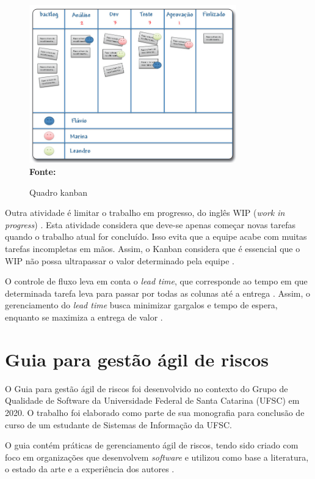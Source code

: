 \documentclass[
    12pt,       %
    openright,      %
    twoside,      %
    a4paper,      %
    english,      %
    french,       %
    spanish,      %
    brazil,       %
    ]{abntex2}
\begin{document}
\begin{figure}[h!]
    \centering
    \caption{Quadro kanban}
    \includegraphics[width=0.8\textwidth]{src/tex/img/quadroKanban.png}\\
    \textbf{Fonte:} 
    \label{fig:kanban}
\end{figure}

Outra atividade é limitar o trabalho em progresso, do inglês WIP (\textit{work in progress}) \cite{Mariotti:2012}. Esta atividade considera que deve-se apenas começar novas tarefas quando o trabalho atual for concluído. Isso evita que a equipe acabe com muitas tarefas incompletas em mãos. Assim, o Kanban considera que é essencial que o WIP não possa ultrapassar o valor determinado pela equipe \cite{ANDERSON:2016}.

O controle de fluxo leva em conta o \textit{lead time}, que corresponde ao tempo em que determinada tarefa leva para passar por todas as colunas até a entrega \cite{Mariotti:2012}. Assim, o gerenciamento do \textit{lead time} busca minimizar gargalos e tempo de espera, enquanto se maximiza a entrega de valor \cite{ANDERSON:2016}. 

\section{Guia para gestão ágil de riscos}

O Guia para gestão ágil de riscos foi desenvolvido no contexto do Grupo de Qualidade de Software da Universidade Federal de Santa Catarina (UFSC) em 2020. O trabalho foi elaborado como parte de sua monografia para conclusão de curso de um estudante de Sistemas de Informação da UFSC.

O guia contém práticas de gerenciamento ágil de riscos, tendo sido criado com foco em organizações que desenvolvem \textit{software} e utilizou como base a literatura, o estado da arte e a experiência dos autores \cite{Vieira:2020}.
\end{document}
